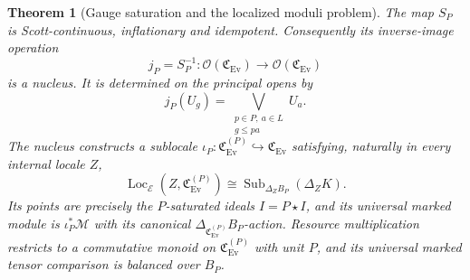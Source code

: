 \documentclass[11pt,a4paper]{article}
\numberwithin{algorithm}{section}
\numberwithin{equation}{section}
\newtheorem{theorem}{Theorem}[section]
\theoremstyle{definition}
\theoremstyle{remark}
\theoremstyle{plain}
\newcommand{\E}{\mathcal E}
\newcommand{\OO}{\mathcal O}
\newcommand{\incl}{\hookrightarrow}
\newcommand{\Ev}{{\operatorname{Ev}}}
\newcommand{\Cplx}{\mathfrak C_{\Ev}}
\theoremstyle{definition}
\theoremstyle{plain}
\begin{document}
\begin{theorem}[Gauge saturation and the localized moduli problem]
\label{thm:gauge-sublocale}
The map $S_P$ is Scott-continuous, inflationary and idempotent.
Consequently its inverse-image operation
\[
 j_P=S_P^{-1}:\OO(\Cplx)\longrightarrow\OO(\Cplx)
\]
is a nucleus.  It is determined on the principal opens by
\begin{equation}\label{eq:gauge-nucleus}
 j_P(U_g)=\bigvee_{\substack{p\in P,\ a\in L\\g\le pa}}U_a.
\end{equation}
The nucleus constructs a sublocale
$\iota_P:\Cplx^{(P)}\incl\Cplx$ satisfying, naturally in every
internal locale $Z$,
\begin{equation}\label{eq:localized-moduli-classification}
 \operatorname{Loc}_{\E}(Z,\Cplx^{(P)})
 \cong\operatorname{Sub}_{\Delta_ZB_P}(\Delta_ZK).
\end{equation}
Its points are precisely the $P$-saturated ideals $I=P\star I$,
and its universal marked module is $\iota_P^*\mathscr M$ with
its canonical $\Delta_{\Cplx^{(P)}}B_P$-action.  Resource
multiplication restricts to a commutative monoid on $\Cplx^{(P)}$
with unit $P$, and its universal marked tensor comparison is
balanced over $B_P$.
\end{theorem}
\end{document}
